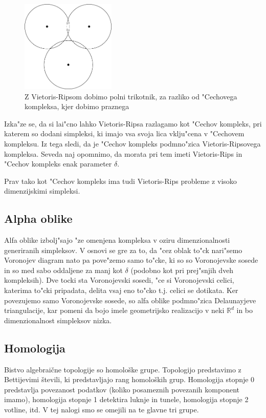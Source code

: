 \documentclass[11pt]{article}
\begin{document}
\begin{figure}[!htb]
    \centering
    \includegraphics[width=0.4\textwidth]{vrdiag.png}
    \caption{Z Vietoris-Ripsom dobimo polni trikotnik, za razliko od "Cechovega kompleksa, kjer dobimo praznega}
    \label{fig:vrdiag}
\end{figure}

Izka"ze se, da si lai"cno lahko Vietoris-Ripsa razlagamo kot "Cechov kompleks, pri katerem so dodani simpleksi, ki imajo vsa svoja lica vklju"cena v "Cechovem kompleksu. Iz tega sledi, da je "Cechov kompleks podmno"zica Vietoris-Ripsovega kompleksa. Seveda naj opomnimo, da morata pri tem imeti Vietoris-Rips in "Cechov kompleks enak parameter $\delta$. 

Prav tako kot "Cechov kompleks ima tudi Vietoris-Rips probleme z visoko dimenzijskimi simpleksi.

\subsection{Alpha oblike}

Alfa oblike izbolj"sajo "ze omenjena kompleksa v oziru dimenzionalnosti generiranih simpleksov. V osnovi se gre za to, da "cez oblak to"ck nari"semo Voronojev diagram nato pa pove"zemo samo to"cke, ki so so Voronojevske sosede in so med sabo oddaljene za manj kot $\delta$ (podobno kot pri prej"snjih dveh kompleksih). Dve tocki sta Voronojevski sosedi, "ce si Voronojevski celici, katerima to"cki pripadata, delita vsaj eno to"cko t.j. celici se dotikata. Ker povezujemo samo Voronojevske sosede, so alfa oblike podmno"zica Delaunayjeve triangulacije, kar pomeni da bojo imele geometrijsko realizacijo v neki $\mathbb{R}^{d}$ in bo dimenzionalnost simpleksov nizka. 

\subsection{Homologija}

Bistvo algebraične topologije so homološke grupe. Topologijo predstavimo z Bettijevimi števili, ki predstavljajo rang homoloških grup. Homologija stopnje 0 predstavlja povezanost podatkov (koliko posameznih povezanih komponent imamo), homologija stopnje 1 detektira luknje in tunele, homologija stopnje 2 votline, itd. V tej nalogi smo se omejili na te glavne tri grupe. 
\end{document}
